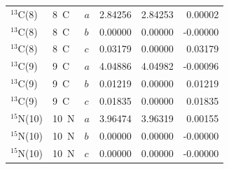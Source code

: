 \begin{longtable}{lllrrr}
$^{13}$C(8) & 8~C & $a$ & 2.84256 & 2.84253 & 0.00002 \\
$^{13}$C(8) & 8~C & $b$ & 0.00000 & 0.00000 & -0.00000 \\
$^{13}$C(8) & 8~C & $c$ & 0.03179 & 0.00000 & 0.03179 \\
$^{13}$C(9) & 9~C & $a$ & 4.04886 & 4.04982 & -0.00096 \\
$^{13}$C(9) & 9~C & $b$ & 0.01219 & 0.00000 & 0.01219 \\
$^{13}$C(9) & 9~C & $c$ & 0.01835 & 0.00000 & 0.01835 \\
$^{15}$N(10) & 10~N & $a$ & 3.96474 & 3.96319 & 0.00155 \\
$^{15}$N(10) & 10~N & $b$ & 0.00000 & 0.00000 & -0.00000 \\
$^{15}$N(10) & 10~N & $c$ & 0.00000 & 0.00000 & -0.00000 \\
\bottomrule
\end{longtable}
